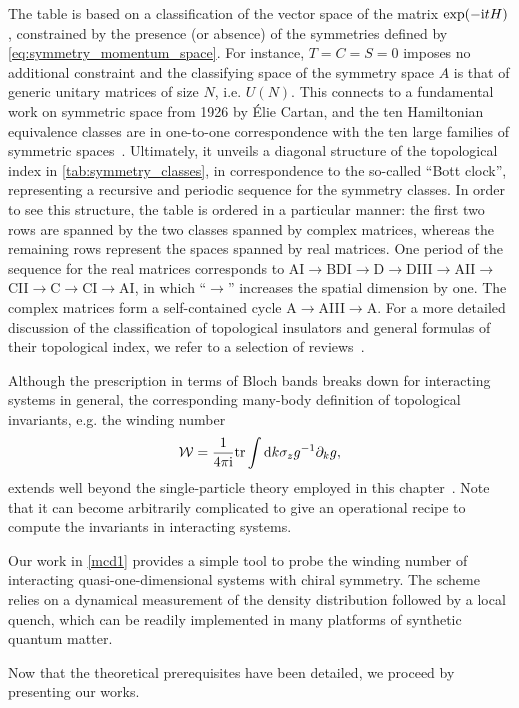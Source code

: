 The table is based on a classification of the vector space of the matrix $\exp(-\mathrm i t H)$, constrained by the presence (or absence) of the symmetries defined by \cref{eq:symmetry_momentum_space}.
For instance, $T=C=S=0$ imposes no additional constraint and the classifying space of the symmetry space $A$ is that of generic unitary matrices of size $N$, i.e. $U(N)$.
This connects to a fundamental work on symmetric space from 1926 by Élie Cartan, and the ten Hamiltonian equivalence classes are in one-to-one correspondence with the ten large families of symmetric spaces~\cite{Heinzner2005}.
Ultimately, it unveils a diagonal structure of the topological index in \cref{tab:symmetry_classes}, in correspondence to the so-called ``Bott clock'', representing a recursive and periodic sequence for the symmetry classes.
In order to see this structure, the table is ordered in a particular manner: the first two rows are spanned by the two classes spanned by complex matrices, whereas the remaining rows represent the spaces spanned by real matrices.
One period of the sequence for the real matrices corresponds to AI$\rightarrow$BDI$\rightarrow$D$\rightarrow$DIII$\rightarrow$AII$\rightarrow$CII$\rightarrow$C$\rightarrow$CI$\rightarrow$AI, in which ``$\rightarrow$'' increases the spatial dimension by one.
The complex matrices form a self-contained cycle A$\rightarrow$AIII$\rightarrow$A.
For a more detailed discussion of the classification of topological insulators and general formulas of their topological index, we refer to a selection of reviews~\cite{Hasan2010,Chiu2016,Cooper2019}.

Although the prescription in terms of Bloch bands breaks down for interacting systems in general, the corresponding many-body definition of topological invariants, e.g. the winding number
\begin{align}
    \mathcal W = \frac{1}{4\pi\mathrm i} {\rm tr}\int\mathrm d k \sigma_z g^{-1}\partial_k g,
    \label{eq:winding_number_greens}
\end{align}
extends well beyond the single-particle theory employed in this chapter~\cite{Gurarie2011,Manmana2012}.
Note that it can become arbitrarily complicated to give an operational recipe to compute the invariants in interacting systems.

Our work in \cref{mcd1} provides a simple tool to probe the winding number of interacting quasi-one-dimensional systems with chiral symmetry.
The scheme relies on a dynamical measurement of the density distribution followed by a local quench, which can be readily implemented in many platforms of synthetic quantum matter.

Now that the theoretical prerequisites have been detailed, we proceed by presenting our works.
